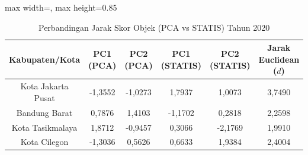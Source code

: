 \begin{table}[H]
\centering
\caption{Perbandingan Jarak Skor Objek (PCA vs STATIS) Tahun 2020} \label{tab:sample2jarak_skor_2020}
\begin{adjustbox}{max width=\textwidth, max height=0.85\textheight}
\begin{tabular}{|c|c|c|c|c|c|}
\hline
\textbf{Kabupaten/Kota} & \textbf{PC1 (PCA)} & \textbf{PC2 (PCA)} & \textbf{PC1 (STATIS)} & \textbf{PC2 (STATIS)} & \textbf{Jarak Euclidean ($d$)} \\
\hline
Kota Jakarta Pusat & -1,3552 & -1,0273 & 1,7937 & 1,0073 & 3,7490 \\
Bandung Barat & 0,7876 & 1,4103 & -1,1702 & 0,2818 & 2,2598 \\
Kota Tasikmalaya & 1,8712 & -0,9457 & 0,3066 & -2,1769 & 1,9910 \\
Kota Cilegon & -1,3036 & 0,5626 & 0,6633 & 1,9384 & 2,4004 \\
\hline
\end{tabular}
\end{adjustbox}
\end{table}